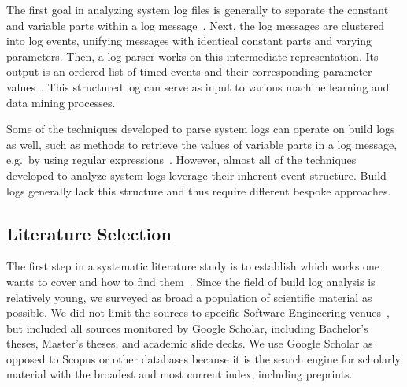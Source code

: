 The first goal in analyzing system log files is generally to
separate the constant and variable parts within a log
message~\cite{nagappan2010abstracting,he2017towards}.
Next, the log
messages are clustered into log events, unifying messages with
identical constant parts and varying parameters.
Then, a log parser works on this intermediate representation.
Its output is an ordered list of timed events and their corresponding
parameter values~\cite{he2016evaluation}.
This structured log can serve as input to various machine learning and
data mining processes.

Some of the techniques developed to parse system logs can operate
on build logs as well, such as methods to retrieve the
values of variable parts in a log message, e.g.\, by using regular
expressions~\cite{nagappan2010abstracting,xu2009detecting}.
However, almost all of the techniques developed to analyze system logs
leverage their inherent event structure.
Build logs generally lack this structure and thus require different
bespoke approaches.

\subsection{Literature Selection}
The first step in a systematic literature study is to
establish which works one wants to cover and how to find
them~\cite{kitchenham2009systematic}.
Since the field of build log analysis is relatively young, we
surveyed as broad a population of scientific material as possible.
We did not limit the sources to specific Software Engineering
venues~\cite{petersen2015guidelines}, but included all sources
monitored by Google Scholar, including Bachelor's theses, Master's
theses, and academic slide decks.
We use Google Scholar as opposed to Scopus or
other databases because it is the search engine for scholarly material
with
the broadest and most current index, including preprints.

